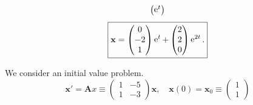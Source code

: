 {\begin{Solution}
\begin{align*}
\begin{pmatrix}
      \mathop{\mathrm{e}}\nolimits^t \end{pmatrix}
  \end{align*}
  \[
  \boxed{
    \mathbf{x} = 
    \begin{pmatrix} 0 \\ -2 \\ 1 \end{pmatrix} \mathop{\mathrm{e}}\nolimits^t
    + \begin{pmatrix} 2 \\ 2 \\ 0 \end{pmatrix} \mathop{\mathrm{e}}\nolimits^{2 t}.
    }
  \]
\end{Solution}












\begin{Solution}
  \label{solution x'=(1-51-3)x}
  We consider an initial value problem.
  \[
  \mathbf{x}' = \mathbf{A} x \equiv
  \begin{pmatrix}
    1 & -5 \\
    1 & -3
  \end{pmatrix} 
  \mathbf{x}, \quad 
  \mathbf{x}(0) = \mathbf{x}_0 \equiv
  \begin{pmatrix}
    1 \\
    1
  \end{pmatrix}
  \]


\end{Solution}}
